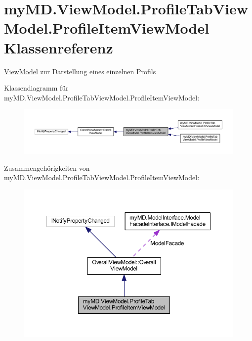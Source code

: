 \hypertarget{classmy_m_d_1_1_view_model_1_1_profile_tab_view_model_1_1_profile_item_view_model}{}\section{my\+M\+D.\+View\+Model.\+Profile\+Tab\+View\+Model.\+Profile\+Item\+View\+Model Klassenreferenz}
\label{classmy_m_d_1_1_view_model_1_1_profile_tab_view_model_1_1_profile_item_view_model}


\mbox{\hyperlink{namespacemy_m_d_1_1_view_model}{View\+Model}} zur Darstellung eines einzelnen Profils  




Klassendiagramm für my\+M\+D.\+View\+Model.\+Profile\+Tab\+View\+Model.\+Profile\+Item\+View\+Model\+:\nopagebreak
\begin{figure}[H]
\begin{center}
\leavevmode
\includegraphics[width=350pt]{classmy_m_d_1_1_view_model_1_1_profile_tab_view_model_1_1_profile_item_view_model__inherit__graph}
\end{center}
\end{figure}


Zusammengehörigkeiten von my\+M\+D.\+View\+Model.\+Profile\+Tab\+View\+Model.\+Profile\+Item\+View\+Model\+:\nopagebreak
\begin{figure}[H]
\begin{center}
\leavevmode
\includegraphics[width=350pt]{classmy_m_d_1_1_view_model_1_1_profile_tab_view_model_1_1_profile_item_view_model__coll__graph}
\end{center}
\end{figure}

